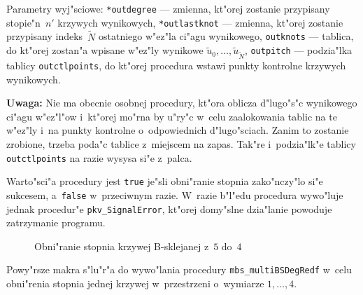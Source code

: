Parametry wyj"sciowe: \texttt{*outdegree} --- zmienna, kt"orej zostanie
przypisany stopie"n~$n'$ krzywych wynikowych, \texttt{*outlastknot} ---
zmienna, kt"orej zostanie przypisany indeks~$\tilde{N}$ ostatniego w"ez"la
ci"agu wynikowego, \texttt{outknots} --- tablica, do kt"orej zostan"a
wpisane w"ez"ly wynikowe $\tilde{u}_0,\ldots,\tilde{u}_{\tilde{N}}$,
\texttt{outpitch} --- podzia"lka tablicy \texttt{outctlpoints},
do kt"orej procedura wstawi punkty kontrolne krzywych wynikowych.

\vspace{\medskipamount}
\textbf{Uwaga:} Nie ma obecnie osobnej procedury, kt"ora oblicza d"lugo"s"c
wynikowego ci"agu w"ez"l"ow i~kt"orej mo"rna by u"ry"c w~celu zaalokowania
tablic na te w"ez"ly i~na punkty kontrolne o~odpowiednich d"lugo"sciach.
Zanim to zostanie zrobione, trzeba poda"c tablice z~miejscem na zapas.
Tak"re i~podzia"lk"e tablicy \texttt{outctlpoints} na razie wysysa si"e
z~palca.

Warto"sci"a procedury jest \texttt{true} je"sli obni"ranie stopnia zako"nczy"lo
si"e sukcesem, a~\texttt{false} w~przeciwnym razie. W~razie b"l"edu
procedura wywo"luje jednak procedur"e \texttt{pkv\_SignalError}, kt"orej
domy"slne dzia"lanie powoduje zatrzymanie programu.


\begin{figure}[ht]
  \centerline{}
  \caption{Obni"ranie stopnia krzywej B-sklejanej z~$5$ do~$4$}
\end{figure}

Powy"rsze makra s"lu"r"a do wywo"lania procedury
\texttt{mbs\_multiBSDegRedf} w~celu obni"renia stopnia jednej krzywej
w~przestrzeni o~wymiarze $1,\ldots,4$.


